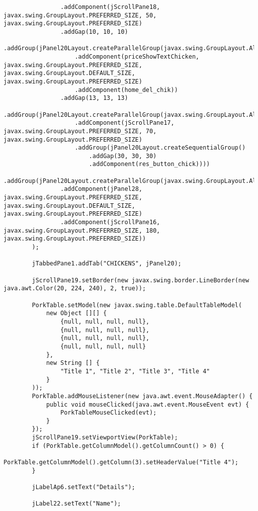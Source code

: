 \documentclass[12pt,a4paper]{article}
\begin{document}
\begin{lstlisting}
                .addComponent(jScrollPane18, javax.swing.GroupLayout.PREFERRED_SIZE, 50, javax.swing.GroupLayout.PREFERRED_SIZE)
                .addGap(10, 10, 10)
                .addGroup(jPanel20Layout.createParallelGroup(javax.swing.GroupLayout.Alignment.LEADING)
                    .addComponent(priceShowTextChicken, javax.swing.GroupLayout.PREFERRED_SIZE, javax.swing.GroupLayout.DEFAULT_SIZE, javax.swing.GroupLayout.PREFERRED_SIZE)
                    .addComponent(home_del_chik))
                .addGap(13, 13, 13)
                .addGroup(jPanel20Layout.createParallelGroup(javax.swing.GroupLayout.Alignment.LEADING)
                    .addComponent(jScrollPane17, javax.swing.GroupLayout.PREFERRED_SIZE, 70, javax.swing.GroupLayout.PREFERRED_SIZE)
                    .addGroup(jPanel20Layout.createSequentialGroup()
                        .addGap(30, 30, 30)
                        .addComponent(res_button_chick))))
            .addGroup(jPanel20Layout.createParallelGroup(javax.swing.GroupLayout.Alignment.TRAILING)
                .addComponent(jPanel28, javax.swing.GroupLayout.PREFERRED_SIZE, javax.swing.GroupLayout.DEFAULT_SIZE, javax.swing.GroupLayout.PREFERRED_SIZE)
                .addComponent(jScrollPane16, javax.swing.GroupLayout.PREFERRED_SIZE, 180, javax.swing.GroupLayout.PREFERRED_SIZE))
        );

        jTabbedPane1.addTab("CHICKENS", jPanel20);

        jScrollPane19.setBorder(new javax.swing.border.LineBorder(new java.awt.Color(20, 224, 240), 2, true));

        PorkTable.setModel(new javax.swing.table.DefaultTableModel(
            new Object [][] {
                {null, null, null, null},
                {null, null, null, null},
                {null, null, null, null},
                {null, null, null, null}
            },
            new String [] {
                "Title 1", "Title 2", "Title 3", "Title 4"
            }
        ));
        PorkTable.addMouseListener(new java.awt.event.MouseAdapter() {
            public void mouseClicked(java.awt.event.MouseEvent evt) {
                PorkTableMouseClicked(evt);
            }
        });
        jScrollPane19.setViewportView(PorkTable);
        if (PorkTable.getColumnModel().getColumnCount() > 0) {
            PorkTable.getColumnModel().getColumn(3).setHeaderValue("Title 4");
        }

        jLabelAp6.setText("Details");

        jLabel22.setText("Name");


\end{lstlisting}
\end{document}
